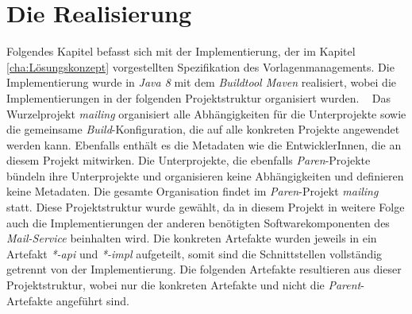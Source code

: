 \chapter{Die Realisierung}
\label{cha:Realisierung}
Folgendes Kapitel befasst sich mit der Implementierung, der im Kapitel \ref{cha:Lösungskonzept} vorgestellten Spezifikation des Vorlagenmanagements. Die Implementierung wurde in \emph{Java 8} mit dem \emph{Buildtool Maven} realisiert, wobei die Implementierungen in der folgenden Projektstruktur organisiert wurden.
\newline
{}
\ \newline
Das Wurzelprojekt \emph{mailing} organisiert alle Abhängigkeiten für die Unterprojekte sowie die gemeinsame \emph{Build}-Konfiguration, die auf alle konkreten Projekte angewendet werden kann. Ebenfalls enthält es die Metadaten wie die EntwicklerInnen, die an diesem Projekt mitwirken. Die Unterprojekte, die ebenfalls \emph{Paren}-Projekte bündeln ihre Unterprojekte und organisieren keine Abhängigkeiten und definieren keine Metadaten. Die gesamte Organisation findet im \emph{Paren}-Projekt \emph{mailing} statt. Diese Projektstruktur wurde gewählt, da in diesem Projekt in weitere Folge auch die Implementierungen der anderen benötigten Softwarekomponenten des \emph{Mail-Service} beinhalten wird. Die konkreten Artefakte wurden jeweils in ein Artefakt \emph{*-api} und \emph{*-impl} aufgeteilt, somit sind die Schnittstellen vollständig getrennt von der Implementierung.
\newline
\newline
Die folgenden Artefakte resultieren aus dieser Projektstruktur, wobei nur die konkreten Artefakte und nicht die \emph{Parent}-Artefakte angeführt sind.
